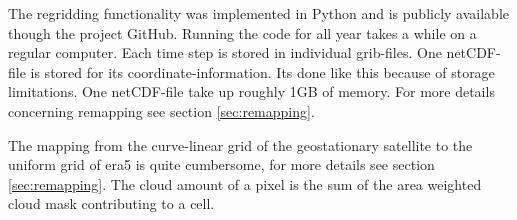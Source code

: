 The regridding functionality was implemented in Python and is publicly available though the project GitHub. Running the code for all year takes a while on a regular computer. Each time step is stored in individual grib-files. One netCDF-file is stored for its coordinate-information. Its done like this because of storage limitations. One netCDF-file take up roughly 1GB of memory. For more details concerning remapping see section \ref{sec:remapping}. 

The mapping from the curve-linear grid of the geostationary satellite to the uniform grid of era5 is quite cumbersome, for more details see section \ref{sec:remapping}. The cloud amount of a pixel is the sum of the area weighted cloud mask contributing to a cell.


